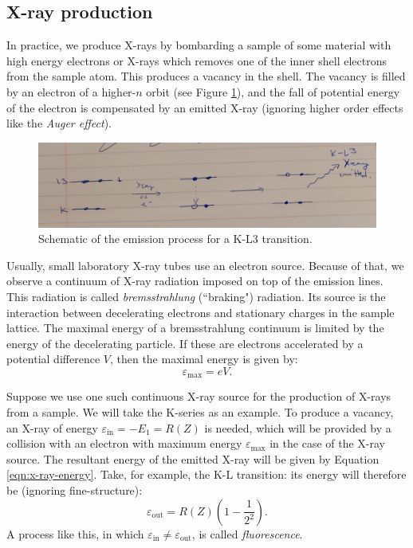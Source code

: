 \documentclass[11pt,a4paper,twoside,onecolumn]{article}
\newcommand{\rydberg}{R}
\begin{document}
\subsection{X-ray production}\label{subsec:x-ray-production}
In practice, we produce X-rays by bombarding a sample of some material with high energy electrons or X-rays which removes one of the inner shell electrons from the sample atom. This produces a vacancy in the shell. The vacancy is filled by an electron of a higher-$n$ orbit (see Figure \ref{fig:emission-diagram}), and the fall of potential energy of the electron is compensated by an emitted X-ray (ignoring higher order effects like the \emph{Auger effect}).

\begin{figure}[!htbp]
    \centering
    \includegraphics[width=\textwidth]{img/emission-diagram.png}
    \caption{Schematic of the emission process for a K-L3 transition.}\label{fig:emission-diagram}
\end{figure}

Usually, small laboratory X-ray tubes use an electron source. Because of that, we observe a continuum of X-ray radiation imposed on top of the emission lines. This radiation is called \emph{bremsstrahlung} (``braking") radiation. Its source is the interaction between decelerating electrons and stationary charges in the sample lattice. The maximal energy of a bremsstrahlung continuum is limited by the energy of the decelerating particle. If these are electrons accelerated by a potential difference $V$, then the maximal energy is given by: 
\begin{equation}\label{eqn:bremss-energy-max}
    \varepsilon_\mathrm{max} = eV.
\end{equation}

Suppose we use one such continuous X-ray source for the production of X-rays from a sample. We will take the K-series as an example. To produce a vacancy, an X-ray of energy $\varepsilon_\mathrm{in} = - E_1 = \rydberg(Z)$ is needed, which will be provided by a collision with an electron with maximum energy $\varepsilon_\mathrm{max}$ in the case of the X-ray source. The resultant energy of the emitted X-ray will be given by Equation \eqref{eqn:x-ray-energy}. Take, for example, the K-L transition: its energy will therefore be (ignoring fine-structure):
\begin{equation}\label{eqn:Kalpha-energy-out}
    \varepsilon_\mathrm{out} = \rydberg\left(Z\right) \left(1 - \frac{1}{2^2}\right).
\end{equation}
A process like this, in which $\varepsilon_\mathrm{in} \neq \varepsilon_\mathrm{out}$, is called \emph{fluorescence}.
\end{document}
